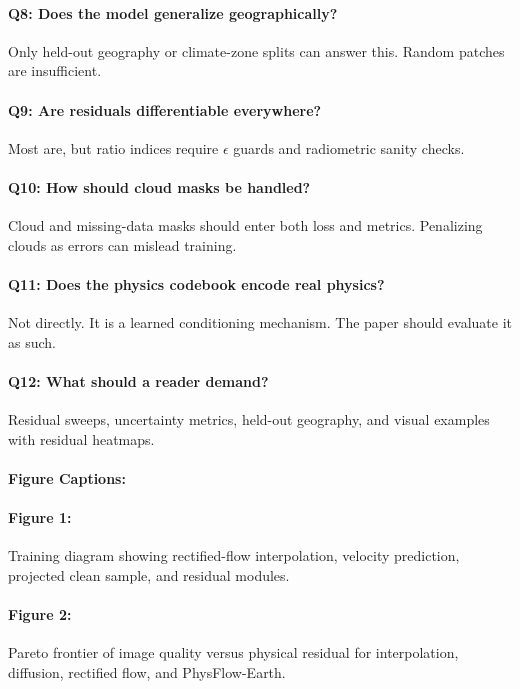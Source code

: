 \documentclass{article}
\begin{document}
\paragraph{Q8: Does the model generalize geographically?}
Only held-out geography or climate-zone splits can answer this. Random patches are insufficient.

\paragraph{Q9: Are residuals differentiable everywhere?}
Most are, but ratio indices require $\epsilon$ guards and radiometric sanity checks.

\paragraph{Q10: How should cloud masks be handled?}
Cloud and missing-data masks should enter both loss and metrics. Penalizing clouds as errors can mislead training.

\paragraph{Q11: Does the physics codebook encode real physics?}
Not directly. It is a learned conditioning mechanism. The paper should evaluate it as such.

\paragraph{Q12: What should a reader demand?}
Residual sweeps, uncertainty metrics, held-out geography, and visual examples with residual heatmaps.

\paragraph{Figure Captions:}

\paragraph{Figure 1:}
Training diagram showing rectified-flow interpolation, velocity prediction, projected clean sample, and residual modules.

\paragraph{Figure 2:}
Pareto frontier of image quality versus physical residual for interpolation, diffusion, rectified flow, and PhysFlow-Earth.
\end{document}
